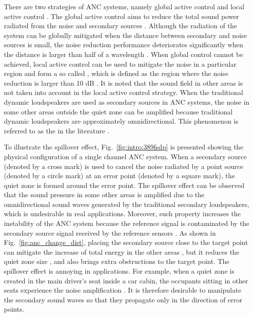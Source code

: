     There are two strategies of ANC systems, namely global active control and local active control \cite{Nelson1992ActiveControlSound}.
    The global active control aims to reduce the total sound power radiated from the noise and secondary sources \cite{Boodoo2015ReviewEffectReflective}. 
    Although the radiation of the system can be globally mitigated when the distance between secondary and noise sources is small, the noise reduction performance deteriorates significantly when the distance is larger than half of a wavelength \cite{Zhong2019IncreasingPerformanceActive, Zhong2019IncreasingPerformanceActivea, Zhong2020PerformanceActiveNoise}.
    When global control cannot be achieved, local active control can be used to mitigate the noise in a particular region and form a so called , which is defined as the region where the noise reduction is larger than 10 dB \cite{Guo1998EffectsReflectiveGround, Elliott2015ModelingLocalActive, Shi2020MultichannelActiveNoise}.
    It is noted that the sound field in other areas is not taken into account in the local active control strategy.
    When the traditional dynamic loudspeakers are used as secondary sources in ANC systems, 
    the noise in some other areas outside the quiet zone can be amplified 
    because traditional dynamic loudspeakers are approximately omnidirectional.
    This phenomenon is referred to as the  in the literature \cite{Guo1997ActivelyCreatedQuiet, Kidner2006FeasibilityStudyLocalised, Tanaka2010ActiveNoiseControl}.

To illustrate the spillover effect, Fig.~\ref{fig:intro:389fsdp} is presented showing the physical configuration of a single channel ANC system.
When a secondary source (denoted by a cross mark) is used to cancel the noise radiated by a point source (denoted by a circle mark) at an error point (denoted by a square mark), 
the quiet zone is formed around the error point.
The spillover effect can be observed that the sound pressure in some other areas is amplified due to the omnidirectional sound waves generated by the traditional secondary loudspeakers, which is undesirable in real applications.
Moreover, such property increases the instability of the ANC system because the reference signal is contaminated by the secondary source signal received by the reference sensors \cite{Tanaka2010ActiveNoiseControl}. 
As shown in Fig.~\ref{fig:anc_change_dist}, placing the secondary source close to the target point can mitigate the increase of total energy in the other areas \cite{Joseph1994FieldZonesQuiet, David1994NumericalStudiesActively}, 
but it reduces the quiet zone size \cite{Guo1998EffectsReflectiveGround}, 
and also brings extra obstructions to the target point.
    The spillover effect is annoying in applications.
    For example, when a quiet zone is created in the main driver's seat inside a car cabin, the occupants sitting in other seats experience the noise amplification \cite{Cheer2012ActiveControlAcoustic, Jung2018MidfrequencyLocalActive}. 
    It is therefore desirable to manipulate the secondary sound waves so that they propagate only in the direction of error points.


